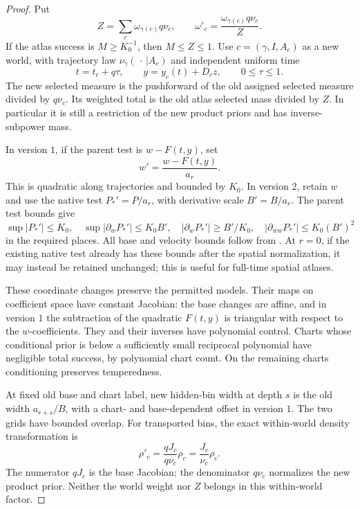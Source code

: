 \begin{proof}
Put
\[
 Z=\sum_c\omega_{\gamma(c)}q\nu_c,\qquad
 \omega'_c=\frac{\omega_{\gamma(c)}q\nu_c}{Z}.
\]
If the atlas success is \(M\ge K_0^{-1}\), then
\(M\le Z\le1\).  Use \(c=(\gamma,I,A_c)\) as a new world,
with trajectory law \(\nu_\gamma(\,\cdot\,|A_c)\) and
independent uniform time
\[
 t=t_c+q\tau,\qquad
 y=y_c(t)+D_cz,\qquad 0\le\tau\le1.
\]
The new selected measure is the pushforward of the old
assigned selected measure divided by \(q\nu_c\).
Its weighted total is the old atlas selected mass divided
by \(Z\).  In particular it is still a restriction of the
new product priors and has inverse-subpower mass.

In version \(1\), if the parent test is \(w-F(t,y)\), set
\[
 w'=\frac{w-F(t,y)}{a_r}.
\]
This is quadratic along trajectories and bounded by \(K_0\).
In version \(2\), retain \(w\) and use the native test
\(P_*'=P/a_r\), with derivative scale \(B'=B/a_r\).
The parent test bounds give
\[
 \sup|P_*'|\le K_0,\quad
 \sup|\partial_wP_*'|\le K_0B',\quad
 |\partial_wP_*'|\ge B'/K_0,\quad
 |\partial_{ww}P_*'|\le K_0(B')^2
\]
in the required places.  All base and velocity bounds
follow from .
At \(r=0\), if the existing native test already has these
bounds after the spatial normalization, it may instead be
retained unchanged; this is useful for full-time
spatial atlases.

These coordinate changes preserve the permitted models.
Their maps on coefficient space have constant Jacobian:
the base changes are affine, and in version \(1\) the
subtraction of the quadratic \(F(t,y)\) is triangular
with respect to the \(w\)-coefficients.
They and their inverses have polynomial control.
Charts whose conditional prior is below a sufficiently
small reciprocal polynomial have negligible total
success, by polynomial chart count.  On the remaining
charts conditioning preserves temperedness.

At fixed old base and chart label, new hidden-bin width
at depth \(s\) is the old width \(a_{r+s}/B\), with a
chart- and base-dependent offset in version \(1\).
The two grids have bounded overlap.
For transported bins, the exact within-world density
transformation is
\begin{equation}
 \rho'_c
 =\frac{qJ_c}{q\nu_c}\rho_c
 =\frac{J_c}{\nu_c}\rho_c.
 \label{a01:exact-density-transform}
\end{equation}
The numerator \(qJ_c\) is the base Jacobian; the denominator
\(q\nu_c\) normalizes the new product prior.
Neither the world weight nor \(Z\) belongs in this
within-world factor.


\end{proof}
